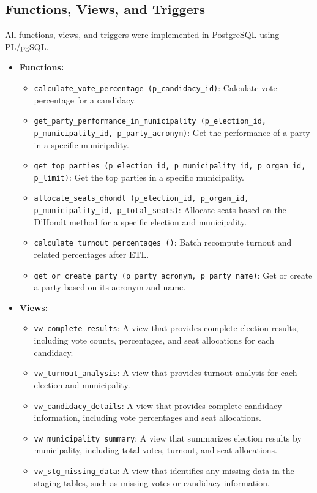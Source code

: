 \subsection{Functions, Views, and Triggers}
All functions, views, and triggers were implemented in PostgreSQL using PL/pgSQL.
\begin{itemize}
    \item \textbf{Functions:}
    \begin{itemize}
        \item \texttt{calculate_vote_percentage (p_candidacy_id)}: Calculate vote percentage for a candidacy.
        \item \texttt{get_party_performance_in_municipality (p_election_id, p_municipality_id,
        p_party_acronym)}: Get the performance of a party in a specific municipality.
        \item \texttt{get_top_parties (p_election_id, p_municipality_id, 
        p_organ_id, p_limit)}: Get the top parties in a specific municipality.
        \item \texttt{allocate_seats_dhondt (p_election_id, p_organ_id, 
        p_municipality_id, p_total_seats)}: Allocate seats based on the D'Hondt method for a specific election and municipality.
        \item \texttt{calculate\_turnout\_percentages ()}: Batch recompute turnout and related percentages after ETL.
        \item \texttt{get_or_create_party (p_party_acronym, p_party_name)}: 
        Get or create a party based on its acronym and name.
    \end{itemize}
    \item \textbf{Views:}
    \begin{itemize}
        \item \texttt{vw_complete_results}: A view that provides complete election results, including vote counts, percentages, and seat allocations for each candidacy.
        \item \texttt{vw_turnout_analysis}: A view that provides turnout analysis for each election and municipality.
        \item \texttt{vw_candidacy_details}: A view that provides complete candidacy information, including vote percentages and seat allocations.
        \item \texttt{vw_municipality_summary}: A view that summarizes election results by municipality, including total votes, turnout, and seat allocations.
        \item \texttt{vw_stg_missing_data}: A view that identifies any missing data in the staging tables, such as missing votes or candidacy information.

\end{itemize}
\end{itemize}
